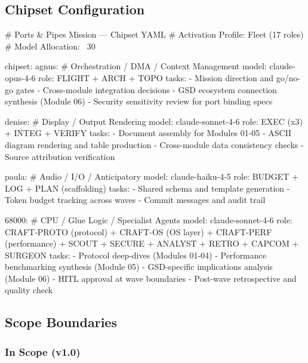 \documentclass[11pt,letterpaper]{article}
\begin{document}
\subsection{Chipset Configuration}

\begin{asciibox}
# Ports & Pipes Mission — Chipset YAML
# Activation Profile: Fleet (17 roles)
# Model Allocation: ~30%

chipset:
  agnus:        # Orchestration / DMA / Context Management
    model:      claude-opus-4-6
    role:       FLIGHT + ARCH + TOPO
    tasks:
      - Mission direction and go/no-go gates
      - Cross-module integration decisions
      - GSD ecosystem connection synthesis (Module 06)
      - Security sensitivity review for port binding specs

  denise:       # Display / Output Rendering
    model:      claude-sonnet-4-6
    role:       EXEC (x3) + INTEG + VERIFY
    tasks:
      - Document assembly for Modules 01-05
      - ASCII diagram rendering and table production
      - Cross-module data consistency checks
      - Source attribution verification

  paula:        # Audio / I/O / Anticipatory
    model:      claude-haiku-4-5
    role:       BUDGET + LOG + PLAN (scaffolding)
    tasks:
      - Shared schema and template generation
      - Token budget tracking across waves
      - Commit messages and audit trail

  68000:        # CPU / Glue Logic / Specialist Agents
    model:      claude-sonnet-4-6
    role:       CRAFT-PROTO (protocol) + CRAFT-OS (OS layer)
             + CRAFT-PERF (performance) + SCOUT + SECURE
             + ANALYST + RETRO + CAPCOM + SURGEON
    tasks:
      - Protocol deep-dives (Modules 01-04)
      - Performance benchmarking synthesis (Module 05)
      - GSD-specific implications analysis (Module 06)
      - HITL approval at wave boundaries
      - Post-wave retrospective and quality check
\end{asciibox}

\subsection{Scope Boundaries}

\subsubsection{In Scope (v1.0)}
\end{document}
